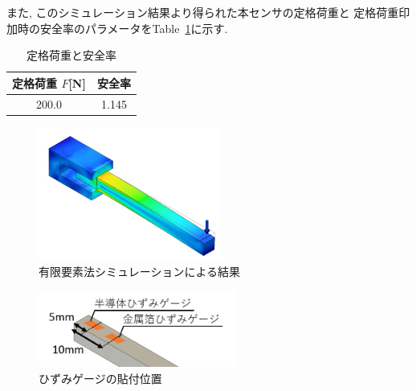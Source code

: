 また, このシミュレーション結果より得られた本センサの定格荷重と
定格荷重印加時の安全率のパラメータをTable~\ref{tb:kajuu}に示す.

\begin{table}[h]
  \caption{定格荷重と安全率}\label{tb:kajuu}
  \begin{center}
   \begin{tabular}{ c c }
    \hline
    定格荷重 $F$[N] & 安全率 \\
    \hline
    200.0 & 1.145 \\
    \hline   
   \end{tabular}
  \end{center}
 \end{table}

\begin{figure}[h]
  \begin{center}
    \includegraphics[width=6.0cm]{pic/simHizumi.jpg}
    \caption{有限要素法シミュレーションによる結果}\label{fig:sim}
  \end{center}
\end{figure}

\begin{figure}[h]
  \begin{center}
    \includegraphics[width=6.5cm]{pic/hizumi.jpg}
    \caption{ひずみゲージの貼付位置}\label{fig:hizumi}
  \end{center}
\end{figure}